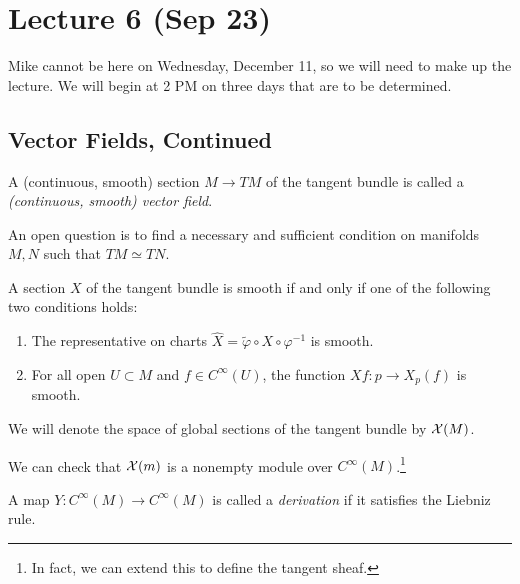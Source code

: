 \documentclass[twoside, 10pt]{article}
\begin{document}
    \section{Lecture 6 (Sep 23)}%
    \label{sec:lecture_6_sep_23_}
    
    Mike cannot be here on Wednesday, December 11, so we will need to make up the lecture. We will begin at 2 PM on three days that are to be determined.

    \subsection{Vector Fields, Continued}%
    \label{sub:vector_fields_continued}
    
    \begin{defn}
        A (continuous, smooth) section $M \to TM$ of the tangent bundle is called a \textit{(continuous, smooth) vector field}.
    \end{defn}
    
    \begin{rmk}
        An open question is to find a necessary and sufficient condition on manifolds $M,N$ such that $TM \simeq TN$.
    \end{rmk}
    
    \begin{lem}
        A section $X$ of the tangent bundle is smooth if and only if one of the following two conditions holds:
        \begin{enumerate}
            \item The representative on charts $\widehat{X} = \widetilde{\varphi} \circ X \circ \varphi^{-1}$ is smooth.
            \item For all open $U \subset M$ and $f \in C^{\infty}(U)$, the function $Xf:p \to X_p(f)$ is smooth.
        \end{enumerate}
    \end{lem}
    
    \begin{notn}
        We will denote the space of global sections of the tangent bundle by $\mathcal{X}(M)$. 
    \end{notn}

    We can check that $\mathcal{X}(m)$ is a nonempty module over $C^{\infty}(M)$.\footnote{In fact, we can extend this to define the tangent sheaf.}

    \begin{defn}
        A map $Y: C^{\infty}(M) \to C^{\infty}(M)$ is called a \textit{derivation} if it satisfies the Liebniz rule.
    \end{defn}
\end{document}
